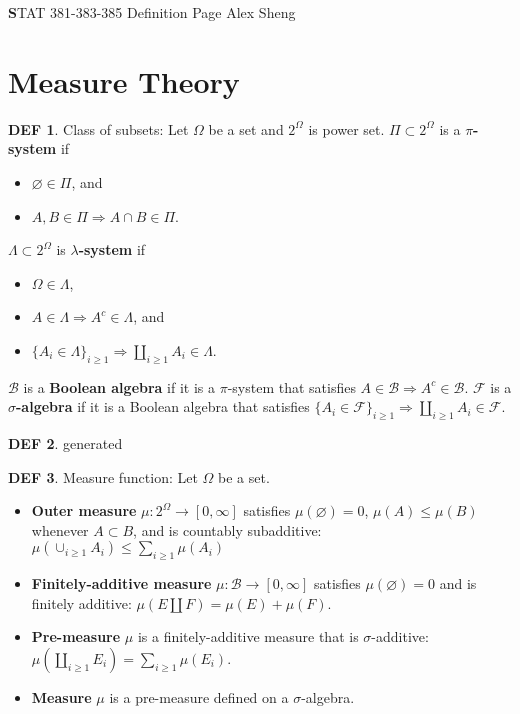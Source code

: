 \documentclass[hidelinks,11pt]{article}
\theoremstyle{definition}
\newtheorem*{defin}{DEF}
\theoremstyle{dotless}
\theoremstyle{remark}
\DeclareMathOperator{\1}{\mathbf{1}}
\begin{document}
\begin{center}
{\Large\textbf STAT 381-383-385 \hspace{0.1cm} Definition Page}\medbreak
\large{Alex Sheng}
\end{center}

\section{Measure Theory}

\begin{defin}
Class of subsets: Let $\Omega$ be a set and $2^\Omega$ is power set.\newline
$\Pi\subset2^\Omega$ is a \textbf{$\pi$-system} if\begin{itemize}
    \item $\varnothing\in\Pi$, and
    \item $A,B\in\Pi\Rightarrow A\cap B\in\Pi$.
\end{itemize}
$\Lambda\subset2^\Omega$ is \textbf{$\lambda$-system} if\begin{itemize}
    \item $\Omega\in\Lambda$,
    \item $A\in\Lambda\Rightarrow A^c\in\Lambda$, and
    \item $\{A_i\in\Lambda\}_{i\geq1}\Rightarrow\amalg_{i\geq1}A_i\in\Lambda$.
\end{itemize}
$\mathcal{B}$ is a \textbf{Boolean algebra} if it is a $\pi$-system that satisfies $A\in\mathcal{B}\Rightarrow A^c\in\mathcal{B}$.\newline
$\mathcal{F}$ is a \textbf{$\sigma$-algebra} if it is a Boolean algebra that satisfies $\{A_i\in\mathcal{F}\}_{i\geq1}\Rightarrow\amalg_{i\geq1}A_i\in\mathcal{F}$.\newline
\end{defin}

\begin{defin}
generated
\end{defin}

\begin{defin}
Measure function: Let $\Omega$ be a set.\begin{itemize}
    \item \textbf{Outer measure} $\mu:2^\Omega\to[0,\infty]$ satisfies $\mu(\varnothing)=0$, $\mu(A)\leq\mu(B)$ whenever $A\subset B$, and is countably subadditive: $\mu(\cup_{i\geq1}A_i)\leq\sum_{i\geq1}\mu(A_i)$
    \item \textbf{Finitely-additive measure} $\mu:\mathcal{B}\to[0,\infty]$ satisfies $\mu(\varnothing)=0$ and is finitely additive: $\mu(E\amalg F)=\mu(E)+\mu(F)$.
    \item \textbf{Pre-measure} $\mu$ is a finitely-additive measure that is $\sigma$-additive: $\mu(\amalg_{i\geq1}E_i)=\sum_{i\geq1}\mu(E_i)$.
    \item \textbf{Measure} $\mu$ is a pre-measure defined on a $\sigma$-algebra.
\end{itemize}
\end{defin}
\end{document}
